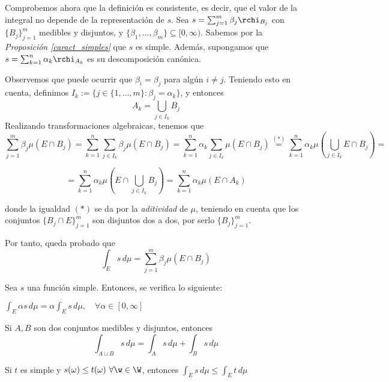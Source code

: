 Comprobemos ahora que la definición es consistente, es decir, que el valor de la integral no depende de la representación de $s$. Sea $s = \sum_{j=1}^m \beta_j \rchi_{B_j}$ con $\{B_j\}_{j=1}^m$ medibles y disjuntos, y $\{\beta_1,\dots,\beta_m\} \subseteq [0,\infty)$. Sabemos por la \textit{Proposición \ref{caract_simples}} que $s$ es simple. Además, supongamos que $s= \sum_{k=1}^n \alpha_k \rchi_{A_k}$ es su descomposición canónica.

Observemos que puede ocurrir que $\beta_i = \beta_j$ para algún $i\neq j$. Teniendo esto en cuenta, definimos $I_k := \{j \in \{1,\dots,m\} : \beta_j = \alpha_k\}$, y entonces $$A_k = \bigcup_{j\in I_k} B_j$$ Realizando transformaciones algebraicas, tenemos que $$\sum_{j=1}^m \beta_j\mu(E \cap B_j) = \sum_{k=1}^n \sum_{j \in I_k} \beta_j \mu(E \cap B_j) = \sum_{k=1}^n \alpha_k \sum_{j \in I_k} \mu(E \cap B_j) \overset{(*)}{=} \sum_{k=1}^n \alpha_k  \mu \left(\bigcup_{j \in I_k} E \cap B_j \right) = $$

$$= \sum_{k=1}^n \alpha_k  \mu \left(E \cap\bigcup_{j \in I_k} B_j \right) = \sum_{k=1}^n \alpha_k  \mu (E \cap A_k)$$

donde la igualdad $(*)$ se da por la \textit{aditividad} de $\mu$, teniendo en cuenta que los conjuntos $\{B_j \cap E\}_{j=1}^m$ son disjuntos dos a dos, por serlo $\{B_j\}_{j=1}^m$.

Por tanto, queda probado que $$\displaystyle \int_E s\, d\mu = \sum_{j=1}^m \beta_j \mu(E \cap B_j)$$


\begin{nprop} \label{int_simples} Sea $s$ una función simple. Entonces, se verifica lo siguiente:
\vspace{0.5em}
    \begin{nlist}
    \item $\displaystyle \int_E \alpha s\, d\mu = \alpha \int_E s\, d\mu, \quad \forall \alpha \in [0,\infty]$
    \item Si $A,B$ son dos conjuntos medibles y disjuntos, entonces $$\int_{A \cup B} s\, d\mu = \int_A s\,d\mu + \int_B s\, d\mu$$
    \item Si $t$ es simple y $\displaystyle s(\omega) \leq t(\omega)\ \forall \w \in \W$, entonces $\displaystyle \int_E s\, d\mu \leq \int_E t\, d\mu$
    \end{nlist}
\end{nprop}

